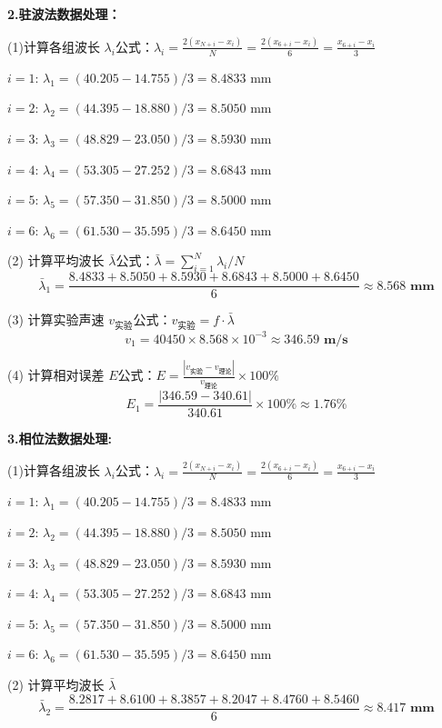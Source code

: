 \documentclass[10pt,a4paper]{ctexart}
\begin{document}
\textbf{2.驻波法数据处理：}

(1)计算各组波长 $\lambda_i$公式：$\lambda_i = \frac{2(x_{N+i} - x_i)}{N} = \frac{2(x_{6+i} - x_i)}{6} = \frac{x_{6+i} - x_i}{3}$
\begin{center}
    

$i=1$: $\lambda_1 = (40.205 - 14.755)/3 = 8.4833 \text{ mm}$

$i=2$: $\lambda_2 = (44.395 - 18.880)/3 = 8.5050 \text{ mm}$

$i=3$: $\lambda_3 = (48.829 - 23.050)/3 = 8.5930 \text{ mm}$

$i=4$: $\lambda_4 = (53.305 - 27.252)/3 = 8.6843 \text{ mm}$

$i=5$: $\lambda_5 = (57.350 - 31.850)/3 = 8.5000 \text{ mm}$

$i=6$: $\lambda_6 = (61.530 - 35.595)/3 = 8.6450 \text{ mm}$
\end{center}

(2) 计算平均波长 $\bar{\lambda}$公式：$\bar{\lambda} = \sum_{i=1}^{N} \lambda_i / N$$$\bar{\lambda}_1 = \frac{8.4833 + 8.5050 + 8.5930 + 8.6843 + 8.5000 + 8.6450}{6} \approx \mathbf{8.568 \text{ mm}}$$

(3) 计算实验声速 $v_{\text{实验}}$公式：$v_{\text{实验}} = f \cdot \bar{\lambda}$$$v_1 = 40450 \times 8.568 \times 10^{-3} \approx \mathbf{346.59 \text{ m/s}}$$

(4) 计算相对误差 $E$公式：$E = \frac{|v_{\text{实验}} - v_{\text{理论}}|}{v_{\text{理论}}} \times 100 \%$$$E_1 = \frac{|346.59 - 340.61|}{340.61} \times 100\% \approx \mathbf{1.76\%}$$

\textbf{3.相位法数据处理:} 

(1)计算各组波长 $\lambda_i$公式：$\lambda_i = \frac{2(x_{N+i} - x_i)}{N} = \frac{2(x_{6+i} - x_i)}{6} = \frac{x_{6+i} - x_i}{3}$
\begin{center}
    

$i=1$: $\lambda_1 = (40.205 - 14.755)/3 = 8.4833 \text{ mm}$

$i=2$: $\lambda_2 = (44.395 - 18.880)/3 = 8.5050 \text{ mm}$

$i=3$: $\lambda_3 = (48.829 - 23.050)/3 = 8.5930 \text{ mm}$

$i=4$: $\lambda_4 = (53.305 - 27.252)/3 = 8.6843 \text{ mm}$

$i=5$: $\lambda_5 = (57.350 - 31.850)/3 = 8.5000 \text{ mm}$

$i=6$: $\lambda_6 = (61.530 - 35.595)/3 = 8.6450 \text{ mm}$
\end{center}

(2) 计算平均波长 $\bar{\lambda}$$$\bar{\lambda}_2 = \frac{8.2817 + 8.6100 + 8.3857 + 8.2047 + 8.4760 + 8.5460}{6} \approx \mathbf{8.417 \text{ mm}}$$
\end{document}
